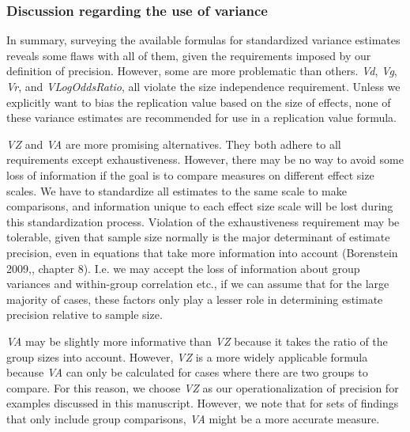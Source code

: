 \documentclass[]{article}
\begin{document}
\hypertarget{discussion-regarding-the-use-of-variance}{%
\subsubsection{Discussion regarding the use of
variance}\label{discussion-regarding-the-use-of-variance}}

In summary, surveying the available formulas for standardized variance
estimates reveals some flaws with all of them, given the requirements
imposed by our definition of precision. However, some are more
problematic than others. \emph{Vd}, \emph{Vg}, \emph{Vr}, and
\emph{VLogOddsRatio}, all violate the size independence requirement.
Unless we explicitly want to bias the replication value based on the
size of effects, none of these variance estimates are recommended for
use in a replication value formula.

\emph{VZ} and \emph{VA} are more promising alternatives. They both
adhere to all requirements except exhaustiveness. However, there may be
no way to avoid some loss of information if the goal is to compare
measures on different effect size scales. We have to standardize all
estimates to the same scale to make comparisons, and information unique
to each effect size scale will be lost during this standardization
process. Violation of the exhaustiveness requirement may be tolerable,
given that sample size normally is the major determinant of estimate
precision, even in equations that take more information into account
(Borenstein 2009,, chapter 8). I.e. we may accept the loss of
information about group variances and within-group correlation etc., if
we can assume that for the large majority of cases, these factors only
play a lesser role in determining estimate precision relative to sample
size.

\emph{VA} may be slightly more informative than \emph{VZ} because it
takes the ratio of the group sizes into account. However, \emph{VZ} is a
more widely applicable formula because \emph{VA} can only be calculated
for cases where there are two groups to compare. For this reason, we
choose \emph{VZ} as our operationalization of precision for examples
discussed in this manuscript. However, we note that for sets of findings
that only include group comparisons, \emph{VA} might be a more accurate
measure.
\end{document}
